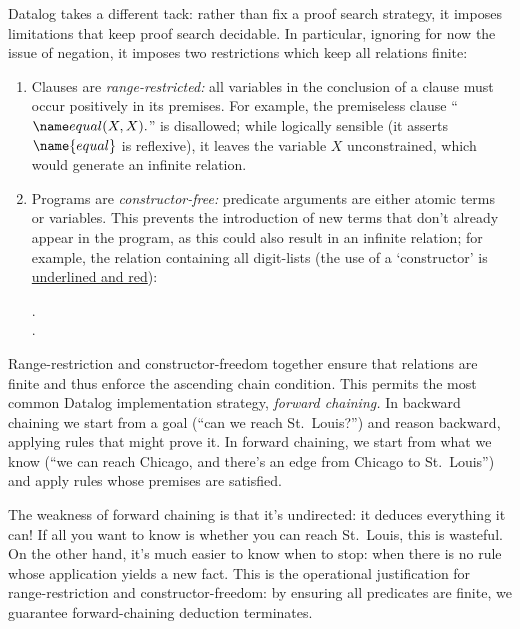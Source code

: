 Datalog takes a different tack: rather than fix a proof search strategy, it
imposes limitations that keep proof search decidable. In particular, ignoring
for now the issue of negation, it imposes two restrictions which keep all
relations finite:

\begin{enumerate}
\item Clauses are \emph{range-restricted:} all variables in the conclusion of a
  clause must occur positively in its premises. For example, the premiseless
  clause ``$\atom{equal}{X,X}.$'' is disallowed; while logically sensible (it
  asserts $\name{equal}$ is reflexive), it leaves the variable $X$
  unconstrained, which would generate an infinite relation.

\item \label{list-of-digits} Programs are \emph{constructor-free:} predicate arguments are either
  atomic terms or variables. This prevents the introduction of new terms that
  don't already appear in the program, as this could also result in an infinite
  relation; for example, the relation containing all digit-lists (the use of a
  `constructor' is {\color{Red}\underline{underlined and red}}):

  \begin{datalog}
    .
    \\
     \gets
     \conj {}.
  \end{datalog}
\end{enumerate}

\noindent
Range-restriction and constructor-freedom together ensure that relations are
finite and thus enforce the ascending chain condition.
%
This permits the most common Datalog implementation strategy, \emph{forward
  chaining.}
%
In backward chaining we start from a goal (``can we reach St.~Louis?'') and
reason backward, applying rules that might prove it.
%
In forward chaining, we start from what we know (``we can reach Chicago, and
there's an edge from Chicago to St.~Louis'') and apply rules whose premises are
satisfied.

The weakness of forward chaining is that it's undirected: it deduces everything
it can! If all you want to know is whether you can reach St.~Louis, this is
wasteful. On the other hand, it's much easier to know when to stop: when there
is no rule whose application yields a new fact. This is the operational
justification for range-restriction and constructor-freedom: by ensuring all
predicates are finite, we guarantee forward-chaining deduction terminates.%
%

